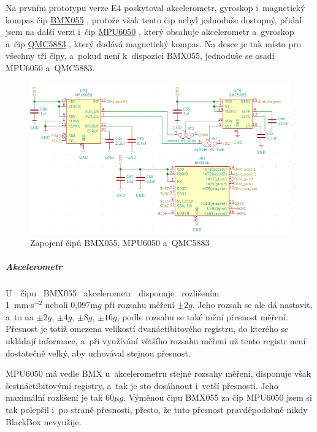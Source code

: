 Na prvním prototypu verze E4 poskytoval akcelerometr, gyroskop i~magnetický kompas čip \href{https://datasheet.lcsc.com/szlcsc/Bosch-Sensortec-BMX055_C94022.pdf}{BMX055} \parencite{bmx055},
protože však tento čip nebyl jednoduše dostupný, přidal jsem na další verzi i~čip \href{https://datasheet.lcsc.com/szlcsc/TDK-InvenSense-MPU-6050_C24112.pdf}{MPU6050} \parencite{mpu6050},
který obsahuje akcelerometr a~gyroskop a~čip \href{https://datasheet.lcsc.com/szlcsc/QST-QMC5883L-TR_C192585.pdf}{QMC5883} \parencite{qmc5883}, který dodává magnetický kompas.
Na desce je tak místo pro všechny tři čipy, a~pokud není k~dispozici BMX055, jednoduše se osadí MPU6050 a~QMC5883. 

\begin{figure}[h]
    \centering
    \includegraphics[width=\textwidth]{kapitoly/obrazky/E4/vnimani/BMX-MPU-QMC.png}
    \caption{Zapojení čipů BMX055, MPU6050 a~QMC5883}
    \label{fig:E4-9axis}
\end{figure}

\vspace{-5mm}

\subparagraph*{Akcelerometr}
\label{akcelerometr}
U~\ čipu \ BMX055 \ akcelerometr \ disponuje \ rozlišením \\ 1~mm$\cdot$s$^{-2}$ neboli 0,097m$g$ při rozsahu měření $\pm2g$. 
Jeho rozsah se ale dá nastavit, a~to na $\pm2g$, $\pm4g$, $\pm8g$, $\pm16g$, 
podle rozsahu se také mění přesnost měření. Přesnost je totiž omezena velikostí dvanáctibitového registru, do 
kterého se ukládají informace, a~při využívání většího 
rozsahu měření už tento registr není dostatečně velký, aby uchovával stejnou přesnost.

MPU6050 má vedle BMX u~akcelerometru stejné rozsahy měření, disponuje však šestnáctibitovými registry, a~tak je 
sto dosáhnout i~vetší přesnosti. Jeho maximální rozlišení je 
tak 60$\mu g$. Výměnou čipu BMX055 za čip MPU6050 jsem si tak polepšil i~po straně přesnosti, přesto, že tuto přesnost 
pravděpo\-dob\-ně nikdy BlackBox nevyužije. %

